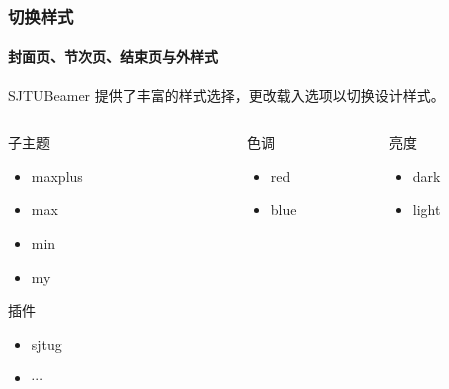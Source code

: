 \documentclass[
    aspectratio=169,  %
]{ctexbeamer}
\begin{document}
\begin{frame}
  \frametitle{切换样式}
  \framesubtitle{封面页、节次页、结束页与外样式}

  SJTUBeamer 提供了丰富的样式选择，更改载入选项以切换设计样式。

  \begin{columns}[T]
    \begin{column}{0.22\textwidth}
      \begin{alertblock}{子主题}
        \ttfamily
        \begin{itemize}
          \item maxplus
          \item max
          \item min
          \item my
        \end{itemize}
      \end{alertblock}
      \begin{block}{插件}
        \ttfamily
        \begin{itemize}
          \item sjtug
          \item $\cdots$
        \end{itemize}
      \end{block}
    \end{column}
    \begin{column}{0.7\textwidth}
      \begin{columns}[t]
        \begin{column}{0.25\textwidth}
          \begin{alertblock}{色调}
            \ttfamily
            \begin{itemize}
              \item red
              \item blue
            \end{itemize}
          \end{alertblock}
        \end{column}
        \begin{column}{0.25\textwidth}
          \begin{alertblock}{亮度}
            \ttfamily
            \begin{itemize}
              \item dark
              \item light
            \end{itemize}
          \end{alertblock}

\end{column}
\end{columns}
\end{column}
\end{columns}
\end{frame}
\end{document}
